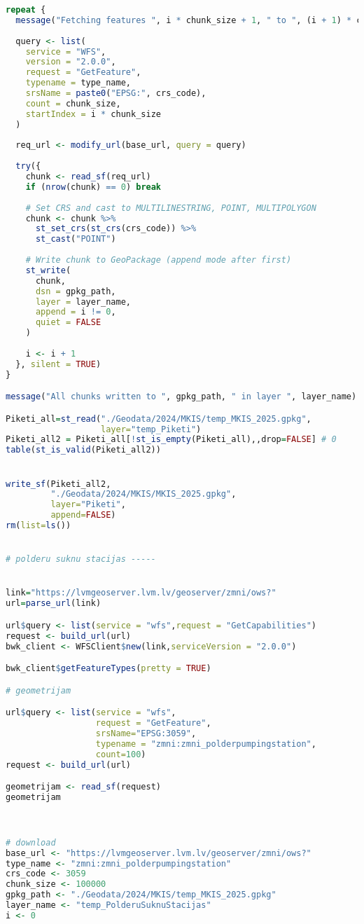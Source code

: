\documentclass[
]{book}
\begin{document}
\begin{lstlisting}[language=R]
repeat {
  message("Fetching features ", i * chunk_size + 1, " to ", (i + 1) * chunk_size, "...")
  
  query <- list(
    service = "WFS",
    version = "2.0.0",
    request = "GetFeature",
    typename = type_name,
    srsName = paste0("EPSG:", crs_code),
    count = chunk_size,
    startIndex = i * chunk_size
  )
  
  req_url <- modify_url(base_url, query = query)
  
  try({
    chunk <- read_sf(req_url)
    if (nrow(chunk) == 0) break
    
    # Set CRS and cast to MULTILINESTRING, POINT, MULTIPOLYGON
    chunk <- chunk %>%
      st_set_crs(st_crs(crs_code)) %>%
      st_cast("POINT")
    
    # Write chunk to GeoPackage (append mode after first)
    st_write(
      chunk, 
      dsn = gpkg_path,
      layer = layer_name,
      append = i != 0,
      quiet = FALSE
    )
    
    i <- i + 1
  }, silent = TRUE)
}

message("All chunks written to ", gpkg_path, " in layer ", layer_name)

Piketi_all=st_read("./Geodata/2024/MKIS/temp_MKIS_2025.gpkg",
                   layer="temp_Piketi")
Piketi_all2 = Piketi_all[!st_is_empty(Piketi_all),,drop=FALSE] # 0
table(st_is_valid(Piketi_all2))


write_sf(Piketi_all2,
         "./Geodata/2024/MKIS/MKIS_2025.gpkg",
         layer="Piketi",
         append=FALSE)
rm(list=ls())


# polderu suknu stacijas -----


link="https://lvmgeoserver.lvm.lv/geoserver/zmni/ows?"
url=parse_url(link)

url$query <- list(service = "wfs",request = "GetCapabilities")
request <- build_url(url)
bwk_client <- WFSClient$new(link,serviceVersion = "2.0.0")

bwk_client$getFeatureTypes(pretty = TRUE)

# geometrijam

url$query <- list(service = "wfs",
                  request = "GetFeature",
                  srsName="EPSG:3059",
                  typename = "zmni:zmni_polderpumpingstation",
                  count=100)
request <- build_url(url)

geometrijam <- read_sf(request)
geometrijam



# download
base_url <- "https://lvmgeoserver.lvm.lv/geoserver/zmni/ows?"
type_name <- "zmni:zmni_polderpumpingstation"
crs_code <- 3059
chunk_size <- 100000
gpkg_path <- "./Geodata/2024/MKIS/temp_MKIS_2025.gpkg"
layer_name <- "temp_PolderuSuknuStacijas"
i <- 0


\end{lstlisting}
\end{document}

